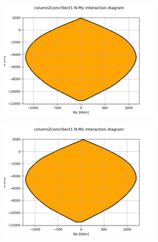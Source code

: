 \begin{center}
\includegraphics[width=80mm]{results/graphics/sections/columnZconcrSect1NMy}
\end{center}
\begin{center}
\includegraphics[width=80mm]{results/graphics/sections/columnZconcrSect1NMz}
\end{center}

